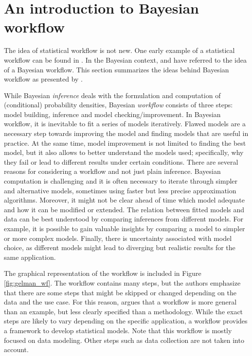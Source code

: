 \section{An introduction to Bayesian workflow}

The idea of statistical workflow is not new.
One early example of a statistical workflow can be found in \cite{box_science_1976}.
In the Bayesian context, \cite{gabry_visualization_2019} and \cite{betancourt_towards_2020} have referred to the idea of a Bayesian workflow.
This section summarizes the ideas behind Bayesian workflow as presented by \cite{gelman_bayesian_2020}.

While Bayesian \textit{inference} deals with the formulation and computation of (conditional) probability densities, Bayesian \textit{workflow} consists of three steps: model building, inference and model checking/improvement.
In Bayesian workflow, it is inevitable to fit a series of models iteratively.
Flawed models are a necessary step towards improving the model and finding models that are useful in practice.
At the same time, model improvement is not limited to finding the best model, but it also allows to better understand the models used; specifically, why they fail or lead to different results under certain conditions.
There are several reasons for considering a workflow and not just plain inference.
Bayesian computation is challenging and it is often necessary to iterate through simpler and alternative models, sometimes using faster but less precise approximation algorithms.
Moreover, it might not be clear ahead of time which model adequate and how it can be modified or extended.
The relation between fitted models and data can be best understood by comparing inferences from different models.
For example, it is possible to gain valuable insights by comparing a model to simpler or more complex models.
Finally, there is uncertainty associated with model choice, as different models might lead to diverging but realistic results for the same application.

The graphical representation of the workflow is included in Figure \ref{fig:gelman_wf}.
The workflow contains many steps, but the authors emphasize that there are some steps that might be skipped or changed depending on the data and the use case.
For this reason, \cite{gelman_bayesian_2020} argues that a workflow is more general than an example, but less clearly specified than a methodology.
While the exact steps are likely to vary depending on the specific application, a workflow provides a framework to develop statistical models.
Note that this workflow is mostly focused on data modeling.
Other steps such as data collection are not taken into account.

